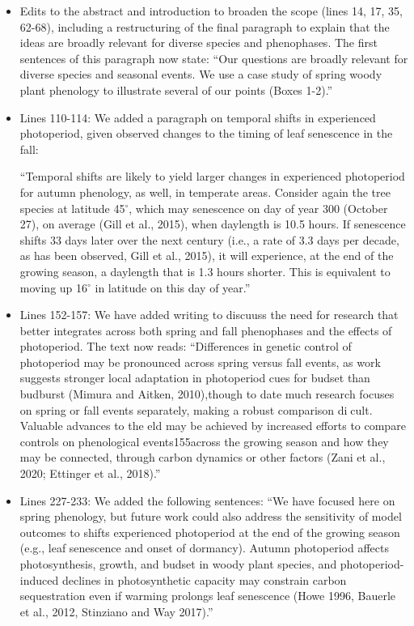 \documentclass{article}
\begin{document}
\begin{itemize}
\item Edits to the abstract and introduction to broaden the scope (lines 14, 17, 35,  62-68), including a restructuring of the final paragraph to explain that the ideas are broadly relevant for diverse species and phenophases. The first sentences of this paragraph now state: ``Our questions are broadly relevant for diverse species and seasonal events. We use a case study of spring woody plant phenology to illustrate several of our points (Boxes 1-2).''  
\item Lines 110-114: We added a paragraph on temporal shifts in experienced photoperiod, given observed changes to the timing of leaf senescence in the fall: 
\par ``Temporal shifts are likely to yield larger changes in experienced photoperiod for autumn phenology, as well, in temperate areas. Consider again the tree species at latitude 45$^{\circ}$, which may senescence on day of year 300 (October 27), on average (Gill et al., 2015), when daylength is 10.5 hours. If senescence shifts 33 days later over the next century (i.e., a rate of 3.3 days per decade, as has been observed, Gill et al., 2015), it will experience, at the end of the growing season, a daylength that is 1.3 hours shorter. This is equivalent to moving up 16$^{\circ}$ in latitude on this day of year.''
\item Lines 152-157: We have added writing to discuuss the need for research that better integrates across both spring and fall phenophases and the effects of photoperiod. The text now reads: ``Differences in genetic control of photoperiod may be pronounced across spring versus fall events,  as work suggests stronger local adaptation in photoperiod cues for budset than budburst (Mimura and Aitken, 2010),though to date much research focuses on spring or fall events separately, making a robust comparison dicult. Valuable advances to the  eld may be achieved by increased efforts to compare controls on phenological events155across the growing season and how they may be connected, through carbon dynamics or other factors (Zani et al., 2020; Ettinger et al., 2018).'' 
\item Lines 227-233: We added the following sentences: ``We have focused here on spring phenology, but future work could also address the sensitivity of model outcomes to shifts experienced photoperiod at the end of the growing season (e.g., leaf senescence and onset of dormancy). Autumn photoperiod affects photosynthesis, growth, and budset in woody plant species, and photoperiod-induced declines in photosynthetic capacity may constrain carbon sequestration even if warming prolongs leaf senescence (Howe 1996, Bauerle et al., 2012, Stinziano and Way 2017).''


\end{itemize}
\end{document}
